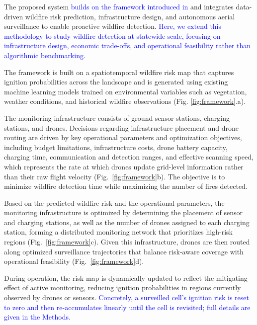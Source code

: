 \documentclass[pdflatex,sn-mathphys-num]{sn-jnl}%
\theoremstyle{thmstyleone}%
\theoremstyle{thmstyletwo}%
\theoremstyle{thmstylethree}%
\newcommand{\blue}[1]{\textcolor{blue}{#1}}
\begin{document}


The proposed system \blue{builds on the framework introduced in \cite{dronebench2025}} and integrates data-driven wildfire risk prediction, infrastructure design, and autonomous aerial surveillance to enable proactive wildfire detection. \blue{Here, we extend this methodology to study wildfire detection at statewide scale, focusing on infrastructure design, economic trade-offs, and operational feasibility rather than algorithmic benchmarking.}

The framework is built on a spatiotemporal wildfire risk map that captures ignition probabilities across the landscape and is generated using existing machine learning models trained on environmental variables such as vegetation, weather conditions, and historical wildfire observations (Fig. \ref{fig:framework}.a).

The monitoring infrastructure consists of ground sensor stations, charging stations, and drones. Decisions regarding infrastructure placement and drone routing are driven by key operational parameters and optimization objectives, including budget limitations, infrastructure costs, drone battery capacity, charging time, communication and detection ranges, and effective scanning speed, which represents the rate at which drones update grid-level information rather than their raw flight velocity (Fig.~\ref{fig:framework}b). The objective is to minimize wildfire detection time while maximizing the number of fires detected.

 Based on the predicted wildfire risk and the operational parameters, the monitoring infrastructure is optimized by determining the placement of sensor and charging stations, as well as the number of drones assigned to each charging station, forming a distributed monitoring network that prioritizes high-risk regions (Fig.~\ref{fig:framework}c). Given this infrastructure, drones are then routed along optimized surveillance trajectories that balance risk-aware coverage with operational feasibility (Fig.~\ref{fig:framework}d). 
 
 During operation, the risk map is dynamically updated to reflect the mitigating effect of active monitoring, reducing ignition probabilities in regions currently observed by drones or sensors. \blue{Concretely, a surveilled cell's ignition risk is reset to zero and then re-accumulates linearly until the cell is revisited; full details are given in the Methods.} 
\captionsetup[subfigure]{
    labelformat=simple,
    labelsep=space,
    font=bf,
    skip=1pt
}
\renewcommand\thesubfigure{\textbf{\alph{subfigure}}}
\end{document}
